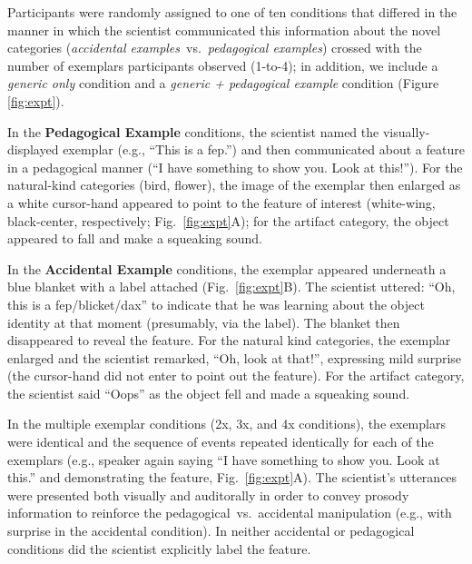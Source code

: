 \documentclass[10pt,letterpaper]{article}
\begin{document}
Participants were randomly assigned to one of ten conditions that differed in the manner in which the scientist communicated this information about the novel categories (\emph{accidental examples}~vs.~\emph{pedagogical examples}) crossed with the number of exemplars participants observed (1-to-4); in addition, we include a \emph{generic only} condition and a \emph{generic + pedagogical example} condition (Figure \ref{fig:expt}). 




In the \textbf{Pedagogical Example} conditions, the scientist named the visually-displayed exemplar (e.g., ``This is a fep.'') and then communicated about a feature in a pedagogical manner (``I have something to show you. Look at this!''). 
For the natural-kind categories (bird, flower), the image of the exemplar then enlarged as a white cursor-hand appeared to point to the feature of interest (white-wing, black-center, respectively; Fig.~\ref{fig:expt}A); for the artifact category, the object appeared to fall and make a squeaking sound. 

In the \textbf{Accidental Example} conditions, the exemplar appeared underneath a blue blanket with a label attached (Fig.~\ref{fig:expt}B). 
The scientist uttered: ``Oh, this is a fep/blicket/dax'' to indicate that he was learning about the object identity at that moment (presumably, via the label).
The blanket then disappeared to reveal the feature.
For the natural kind categories, the exemplar enlarged and the scientist remarked, ``Oh, look at that!'', expressing mild surprise (the cursor-hand did not enter to point out the feature). 
For the artifact category, the scientist said ``Oops'' as the object fell and made a squeaking sound.

In the multiple exemplar conditions (2x, 3x, and 4x conditions), the exemplars were identical and the sequence of events repeated identically for each of the exemplars (e.g., speaker again saying ``I have something to show you. Look at this.'' and demonstrating the feature, Fig.~\ref{fig:expt}A).
The scientist's utterances were presented both visually and auditorally in order to convey prosody information to reinforce the pedagogical~vs.~accidental manipulation (e.g., with surprise in the accidental condition).
In neither accidental or pedagogical conditions did the scientist explicitly label the feature. 

\end{document}
